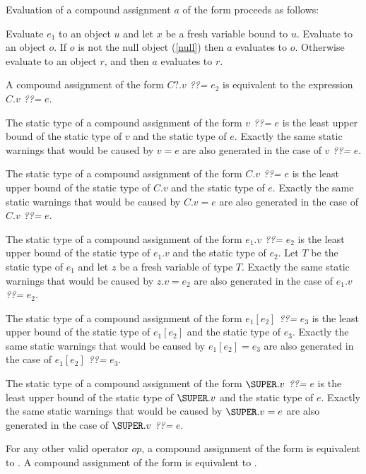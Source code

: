 \documentclass{article}
\begin{document}
\LMHash{}
Evaluation of a compound assignment $a$ of the form 
proceeds as follows:

\LMHash{}
Evaluate $e_1$ to an object $u$ and let $x$ be a fresh variable bound to $u$.
Evaluate  to an object $o$.
If $o$ is not the null object (\ref{null}) then $a$ evaluates to $o$.
Otherwise evaluate  to an object $r$,
and then $a$ evaluates to $r$.


\LMHash{}
A compound assignment of the form $C?.v$ {\em ??=} $e_2$ is equivalent to the expression $C.v$ {\em ??=} $e$.

\LMHash{}
The static type of a compound assignment of the form $v$ {\em ??=} $e$ is the least upper bound of the static type of $v$ and the static type of $e$.
Exactly the same static warnings that would be caused by $v = e$ are also generated in the case of $v$ {\em ??=} $e$.

\LMHash{}
The static type of a compound assignment of the form $C.v$ {\em ??=} $e$ is the least upper bound of the static type of $C.v$ and the static type of $e$.
Exactly the same static warnings that would be caused by $C.v = e$ are also generated in the case of $C.v$ {\em ??=} $e$.

\LMHash{}
The static type of a compound assignment of the form $e_1.v$ {\em ??=} $e_2$ is the least upper bound of the static type of $e_1.v$ and the static type of $e_2$.
Let $T$ be the static type of $e_1$ and let $z$ be a fresh variable of type $T$.
Exactly the same static warnings that would be caused by $z.v = e_2$ are also generated in the case of $e_1.v$ {\em ??=} $e_2$.

\LMHash{}
The static type of a compound assignment of the form $e_1[e_2]$ {\em ??=} $e_3$ is the least upper bound of the static type of $e_1[e_2]$ and the static type of $e_3$.
Exactly the same static warnings that would be caused by $e_1[e_2] = e_3$ are also generated in the case of $e_1[e_2]$ {\em ??=} $e_3$.

\LMHash{}
The static type of a compound assignment of the form $\SUPER.v$ {\em ??=} $e$ is the least upper bound of the static type of $\SUPER.v$ and the static type of $e$.
Exactly the same static warnings that would be caused by $\SUPER.v = e$ are also generated in the case of $\SUPER.v$ {\em ??=} $e$.

\LMHash{}
For any other valid operator $op$, a compound assignment of the form  is equivalent to .
A compound assignment of the form  is equivalent to .
\end{document}
